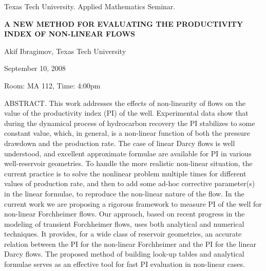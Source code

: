 \documentclass[oneside]{amsart}
\begin{document}
\begin{center}
Texas Tech University. Applied Mathematics Seminar.

\end{center}

\begin{center}

{\LARGE \uppercase{\textbf{A New Method for Evaluating the Productivity Index of Non-Linear Flows}}}

Akif Ibragimov, Texas Tech University

September 10, 2008

Room: MA 112, Time: 4:00pm

\end{center}


ABSTRACT.
This work addresses the effects of non-linearity of flows on the value of the productivity index (PI) of the well. Experimental data show that during the dynamical process of hydrocarbon recovery the PI stabilizes to some constant value, which, in general, is a non-linear function of both the pressure drawdown and the production rate.
The case of linear Darcy flows is well understood, and excellent approximate formulae are available for PI in various well-reservoir geometries. To handle the more realistic non-linear situation, the current practice is to solve the nonlinear problem multiple times for different values of production rate, and then to add some ad-hoc corrective parameter(s) in the linear formulae, to reproduce the non-linear nature of the flow.
In the current work we are proposing a rigorous framework to measure PI   of the well for non-linear Forchheimer flows. Our approach, based on recent progress in the modeling of transient Forchheimer flows, uses both analytical and numerical techniques. It provides, for a wide class of reservoir geometries, an accurate relation between the PI for the non-linear Forchheimer and the PI for the linear Darcy flows.
The proposed method of building look-up tables and analytical formulae serves as an effective tool for fast PI evaluation in non-linear cases.
\end{document}
